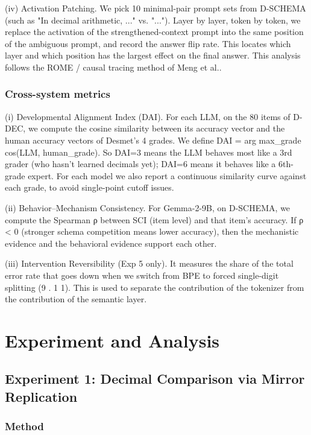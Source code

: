 (iv) Activation Patching. We pick 10 minimal-pair prompt sets from D-SCHEMA (such as "In decimal arithmetic, ..." vs. "..."). Layer by layer, token by token, we replace the activation of the strengthened-context prompt into the same position of the ambiguous prompt, and record the answer flip rate. This locates which layer and which position has the largest effect on the final answer. This analysis follows the ROME / causal tracing method of Meng et al.\cite{meng2022}.

\subsubsection{Cross-system metrics}

(i) Developmental Alignment Index (DAI). For each LLM, on the 80 items of D-DEC, we compute the cosine similarity between its accuracy vector and the human accuracy vectors of Desmet's 4 grades. We define DAI = arg max\_grade {cos(LLM, human\_grade)}. So DAI=3 means the LLM behaves most like a 3rd grader (who hasn't learned decimals yet); DAI=6 means it behaves like a 6th-grade expert. For each model we also report a continuous similarity curve against each grade, to avoid single-point cutoff issues.

(ii) Behavior–Mechanism Consistency. For Gemma-2-9B, on D-SCHEMA, we compute the Spearman ρ between SCI (item level) and that item's accuracy. If ρ < 0 (stronger schema competition means lower accuracy), then the mechanistic evidence and the behavioral evidence support each other.

(iii) Intervention Reversibility (Exp 5 only). It measures the share of the total error rate that goes down when we switch from BPE to forced single-digit splitting (9 . 1 1). This is used to separate the contribution of the tokenizer from the contribution of the semantic layer.

\section{Experiment and Analysis}

\subsection{Experiment 1: Decimal Comparison via Mirror Replication}

\subsubsection{Method}

